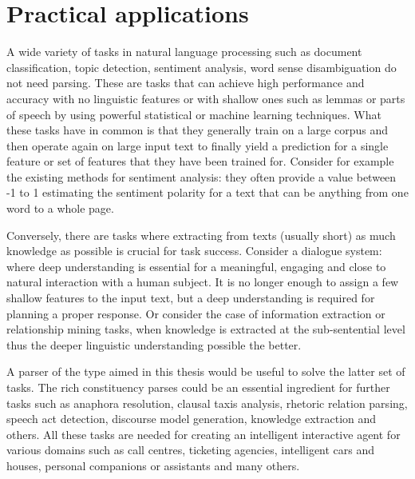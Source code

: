 
\section{Practical applications}
    A wide variety of tasks in natural language processing such as document classification, topic detection, sentiment analysis, word sense disambiguation do not need parsing. These are tasks that can achieve high performance and accuracy with no linguistic features or with shallow ones such as lemmas or parts of speech by using powerful statistical or machine learning techniques. What these tasks have in common is that they generally train on a large corpus and then operate again on large input text to finally yield a prediction for a single feature or set of features that they have been trained for. Consider for example the existing methods for sentiment analysis: they often provide a value between -1 to 1 estimating the sentiment polarity for a text that can be anything from one word to a whole page. 
 
    Conversely, there are tasks where extracting from texts (usually short) as much knowledge as possible is crucial for task success. Consider a dialogue system: where deep understanding is essential for a meaningful, engaging and close to natural interaction with a human subject. It is no longer enough to assign a few shallow features to the input text, but a deep understanding is required for planning a proper response. Or consider the case of information extraction or relationship mining tasks, when knowledge is extracted at the sub-sentential level thus the deeper linguistic understanding possible the better. 

    A parser of the type aimed in this thesis would be useful to solve  the latter set of tasks. 
    The rich constituency parses could be an essential ingredient for further tasks such as anaphora resolution, clausal taxis analysis, rhetoric relation parsing, speech act detection, discourse model generation, knowledge extraction and others. All these tasks are needed for creating an intelligent interactive agent for various domains such as call centres, ticketing agencies, intelligent cars and houses, personal companions or assistants and many others. 

